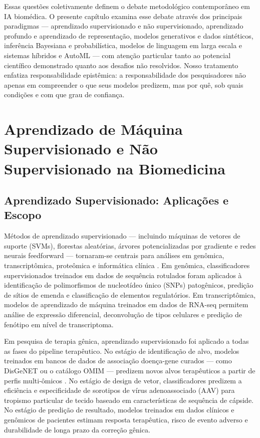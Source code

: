 Essas questões coletivamente definem o debate metodológico contemporâneo em IA biomédica. O presente capítulo examina esse debate através dos principais paradigmas --- aprendizado supervisionado e não supervisionado, aprendizado profundo e aprendizado de representação, modelos generativos e dados sintéticos, inferência Bayesiana e probabilística, modelos de linguagem em larga escala e sistemas híbridos e AutoML --- com atenção particular tanto ao potencial científico demonstrado quanto aos desafios não resolvidos. Nosso tratamento enfatiza responsabilidade epistêmica: a responsabilidade dos pesquisadores não apenas em compreender o que seus modelos predizem, mas por quê, sob quais condições e com que grau de confiança.

\section{Aprendizado de Máquina Supervisionado e Não Supervisionado na Biomedicina}

\subsection{Aprendizado Supervisionado: Aplicações e Escopo}

Métodos de aprendizado supervisionado --- incluindo máquinas de vetores de suporte (SVMs), florestas aleatórias, árvores potencializadas por gradiente e redes neurais feedforward --- tornaram-se centrais para análises em genômica, transcriptômica, proteômica e informática clínica \parencite{libbrecht2015}. Em genômica, classificadores supervisionados treinados em dados de sequência rotulados foram aplicados à identificação de polimorfismos de nucleotídeo único (SNPs) patogênicos, predição de sítios de emenda e classificação de elementos regulatórios. Em transcriptômica, modelos de aprendizado de máquina treinados em dados de RNA-seq permitem análise de expressão diferencial, deconvolução de tipos celulares e predição de fenótipo em nível de transcriptoma.

Em pesquisa de terapia gênica, aprendizado supervisionado foi aplicado a todas as fases do pipeline terapêutico. No estágio de identificação de alvo, modelos treinados em bancos de dados de associação doença-gene curados --- como DisGeNET ou o catálogo OMIM --- predizem novos alvos terapêuticos a partir de perfis multi-ômicos \parencite{danaeifar2025}. No estágio de design de vetor, classificadores predizem a eficiência e especificidade de sorotipos de vírus adenoassociado (AAV) para tropismo particular de tecido baseado em características de sequência de cápside. No estágio de predição de resultado, modelos treinados em dados clínicos e genômicos de pacientes estimam resposta terapêutica, risco de evento adverso e durabilidade de longa prazo da correção gênica.

